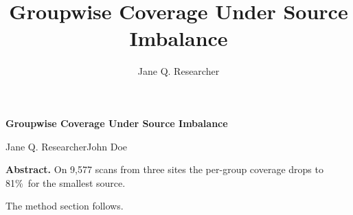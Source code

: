 \documentclass[11pt]{article}
\title{Groupwise Coverage Under Source Imbalance}
\author{Jane Q. Researcher}
\begin{document}
\begin{center}
{\LARGE\bfseries Groupwise Coverage Under Source Imbalance\par}
\vspace{10pt}
{\large Jane Q. Researcher\quad John Doe\par}
\end{center}

\vspace*{6pt}

\noindent\textbf{Abstract.} On 9{,}577 scans from three sites the per-group
coverage drops to 81\%~for the smallest source.




The method section follows.
\end{document}
